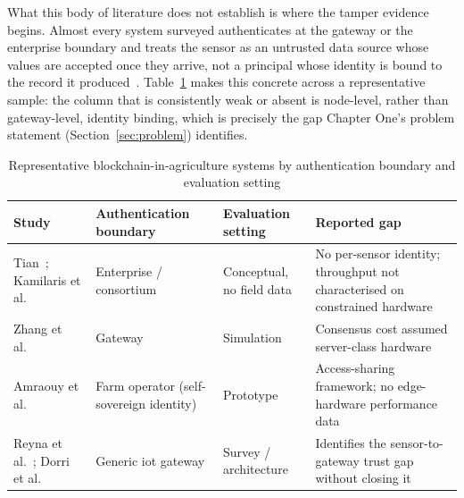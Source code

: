 \documentclass[12pt,a4paper,oneside]{book}
\begin{document}
What this body of literature does not establish is where the tamper
evidence begins. Almost every system surveyed authenticates at the gateway
or the enterprise boundary and treats the sensor as an untrusted data
source whose values are accepted once they arrive, not a principal whose
identity is bound to the record it produced~\cite{lin2020blockchain, ferrag2020blockchain, kamilaris2019rise, ali2023farmDataTampering}. Table~\ref{tab:lit-blockchain-ag} makes this
concrete across a representative sample: the column that is consistently
weak or absent is node-level, rather than gateway-level, identity binding,
which is precisely the gap Chapter One's problem statement
(Section~\ref{sec:problem}) identifies.

\begin{table}[htbp]
\centering
\caption{Representative blockchain-in-agriculture systems by authentication
         boundary and evaluation setting}
\label{tab:lit-blockchain-ag}
\footnotesize
\begin{tabularx}{\textwidth}{@{}p{}p{}p{}X@{}}
\toprule
\textbf{Study} & \textbf{Authentication boundary} & \textbf{Evaluation setting} & \textbf{Reported gap} \\
\midrule
Tian~\cite{tian2016agri}; Kamilaris et al.~\cite{kamilaris2019rise}
  & Enterprise / consortium & Conceptual, no field data
  & No per-sensor identity; throughput not characterised on constrained hardware \\
\midrule
Zhang et al.~\cite{zhang2019blockchain}
  & Gateway & Simulation
  & Consensus cost assumed server-class hardware \\
\midrule
Amraouy et al.~\cite{amraouy2025ssi}
  & Farm operator (self-sovereign identity)
  & Prototype
  & Access-sharing framework; no edge-hardware performance data \\
\midrule
Reyna et al.~\cite{reyna2018blockchain}; Dorri et al.~\cite{dorri2017blockchain}
  & Generic \gls{iot} gateway & Survey / architecture
  & Identifies the sensor-to-gateway trust gap without closing it \\
\bottomrule
\end{tabularx}
\end{table}

\label{subsec:lit_consensus}
\end{document}
